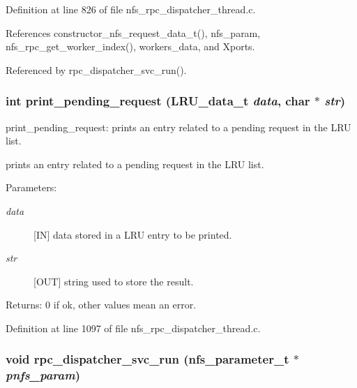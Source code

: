 Definition at line 826 of file nfs\_\-rpc\_\-dispatcher\_\-thread.c.

References constructor\_\-nfs\_\-request\_\-data\_\-t(), nfs\_\-param, nfs\_\-rpc\_\-get\_\-worker\_\-index(), workers\_\-data, and Xports.

Referenced by rpc\_\-dispatcher\_\-svc\_\-run().
\subsubsection{\setlength{\rightskip}{0pt plus 5cm}int print\_\-pending\_\-request (LRU\_\-data\_\-t {\em data}, char $\ast$ {\em str})}\label{nfs__rpc__dispatcher__thread_8c_a25}


print\_\-pending\_\-request: prints an entry related to a pending request in the LRU list.

prints an entry related to a pending request in the LRU list.

\begin{Desc}
\item[Parameters:]
\begin{description}
\item[{\em data}][IN] data stored in a LRU entry to be printed. \item[{\em str}][OUT] string used to store the result.\end{description}
\end{Desc}
\begin{Desc}
\item[Returns:]0 if ok, other values mean an error. \end{Desc}


Definition at line 1097 of file nfs\_\-rpc\_\-dispatcher\_\-thread.c.
\subsubsection{\setlength{\rightskip}{0pt plus 5cm}void rpc\_\-dispatcher\_\-svc\_\-run (nfs\_\-parameter\_\-t $\ast$ {\em pnfs\_\-param})}\label{nfs__rpc__dispatcher__thread_8c_a26}



